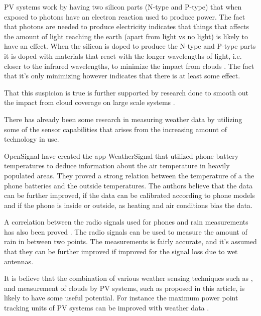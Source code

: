 PV systems work by having two silicon parts (N-type and P-type) that
when exposed to photons have an electron reaction used to produce
power.  The fact that photons are needed to produce electricity
indicates that things that affects the amount of light reaching the
earth (apart from light vs no light) is likely to have an effect.
When the silicon is doped to produce the N-type and P-type parts it is
doped with materials that react with the longer wavelengths of light,
i.e. closer to the infrared wavelengths, to minimize the impact from
clouds \citep{photovoltaic}.  The fact that it's only minimizing
however indicates that there is at least some effect.

That this suspicion is true is further supported by research done to
smooth out the impact from cloud coverage on large scale systems
\citep{southafrica, cloudTrack}.

There has already been some research in measuring weather data by
utilizing some of the sensor capabilities that arises from the
increasing amount of technology in use.

OpenSignal have created the app WeatherSignal that utilized phone
battery temperatures \citep{temperatures2013} to deduce information
about the air temperature in heavily populated areas.  They proved a
strong relation between the temperature of a the phone batteries and
the outside temperatures.  The authors believe that the data can be
further improved, if the data can be calibrated according to phone
models and if the phone is inside or outside, as heating and air
conditions bias the data.

A correlation between the radio signals used for phones and rain
measurements has also been proved \citep{rainfall2007}.  The radio
signals can be used to measure the amount of rain in between two
points.  The measurements is fairly accurate, and it's assumed that
they can be further improved if improved for the signal loss due to
wet antennas.

It is believe that the combination of various weather sensing
techniques such as \cite{rainfall2007}, \cite{temperatures2013} and
measurement of clouds by PV systems, such as proposed in this article,
is likely to have some useful potential.  For instance the maximum
power point tracking units of PV systems can be improved with weather
data \citep{mppt2004}.

